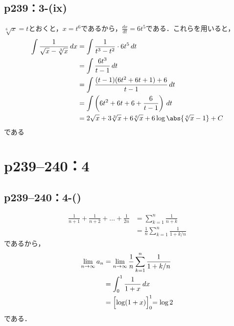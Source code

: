 \documentclass[a4paper,10pt,fleqn]{ltjsarticle}
\begin{document}
\subsection*{p239：3-(ix)}

\begin{tleftbar}
    $\sqrt[6]{x}=t$とおくと，$x=t^6$であるから，$\frac{dx}{dt}=6t^5$である．これらを用いると，
    \begin{align*}
        \int \frac{1}{\sqrt{x}-\sqrt[3]{x}} \, dx & = \int \frac{1}{t^3-t^2} \cdot 6t^5 \, dt                                 \\
                                                  & = \int \frac{6t^3}{t-1} \, dt                                             \\
                                                  & = \int \frac{(t-1)(6t^2+6t+1)+6}{t-1} \, dt                               \\
                                                  & = \int \left (6t^2+6t+6 + \frac{6}{t-1}\right) \, dt                      \\
                                                  & = 2\sqrt{x}+3 \sqrt[3]{x} + 6 \sqrt[6]{x} + 6 \log \abs{\sqrt[6]{x}-1}+ C
    \end{align*}
    である
\end{tleftbar}


\section*{p239--240：4}


\subsection*{p239--240：4-()}

\begin{tleftbar}
    \begin{align*}
        \frac{1}{n+1}+ \frac{1}{n+2}+\dots + \frac{1}{2n} & = \sum_{k=1}^{n} \frac{1}{n+k}               \\
                                                          & = \frac{1}{n} \sum_{k=1}^{n} \frac{1}{1+k/n}
    \end{align*}
    であるから，
    \begin{align*}
        \lim_{n \to \infty} a_n & = \lim_{n \to \infty} \frac{1}{n} \sum_{k=1}^{n} \frac{1}{1+k/n} \\
                                & = \int_{0}^{1} \frac{1}{1+x} \, dx                               \\
                                & = \Bigl [ \log (1+x) \Bigl]_{0}^{1} = \log 2
    \end{align*}
    である．
\end{tleftbar}
\end{document}
